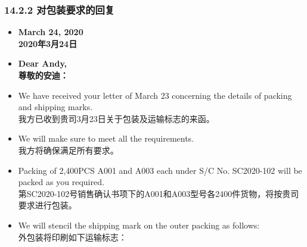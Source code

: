 \documentclass[12pt]{beamer}
\begin{document}
 
    \begin{frame}[allowframebreaks]
    \frametitle{14.2.2 对包装要求的回复}
    \begin{itemize}
    \item \textbf{March 24, 2020} \\
    \textbf{2020年3月24日}
    
    \item \textbf{Dear Andy,} \\
    \textbf{尊敬的安迪：}
    
    \item We have received your letter of March 23 concerning the details of packing and shipping marks. \\
    我方已收到贵司3月23日关于包装及运输标志的来函。
    
    \item We will make sure to meet all the requirements. \\
    我方将确保满足所有要求。
    
    \item Packing of 2,400PCS A001 and A003 each under S/C No. SC2020-102 will be packed as you required. \\
    第SC2020-102号销售确认书项下的A001和A003型号各2400件货物，将按贵司要求进行包装。
    
    \item We will stencil the shipping mark on the outer packing as follows: \\
    外包装将印刷如下运输标志：
    \end{itemize}
\end{frame}
\iffalse
    \begin{frame}
    \begin{verbatim}
    WI\\
    NEW YORK\\
    SC2020-102\\
    C/NO.\\
    \end{verbatim}
\end{frame}
\fi
\end{document}
